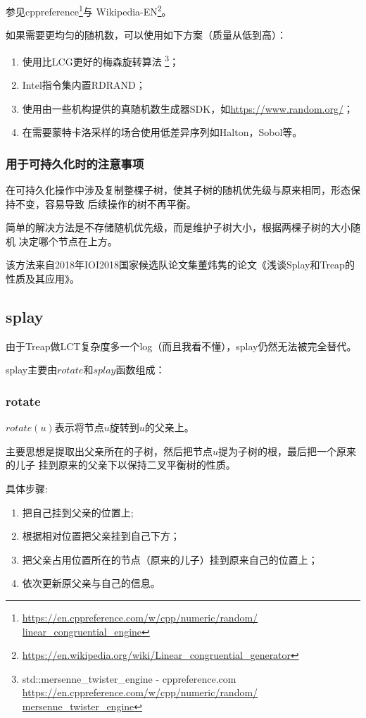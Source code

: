 参见cppreference\footnote{
	\url{https://en.cppreference.com/w/cpp/numeric/random/
		linear\_congruential\_engine}}与
Wikipedia-EN\footnote{
	\url{https://en.wikipedia.org/wiki/Linear\_congruential\_generator}}。

如果需要更均匀的随机数，可以使用如下方案（质量从低到高）：
\begin{enumerate}
	\item 使用比LCG更好的梅森旋转算法
	      \footnote{std::mersenne\_twister\_engine - cppreference.com
		      \url{https://en.cppreference.com/w/cpp/numeric/random/
			      mersenne\_twister\_engine}}；
	\item Intel指令集内置RDRAND；
	\item 使用由一些机构提供的真随机数生成器SDK，如\url{https://www.random.org/}；
	\item 在需要蒙特卡洛采样的场合使用低差异序列如Halton，Sobol等。
\end{enumerate}

\subsubsection{用于可持久化时的注意事项}
在可持久化操作中涉及复制整棵子树，使其子树的随机优先级与原来相同，形态保持不变，容易导致
后续操作的树不再平衡。

简单的解决方法是不存储随机优先级，而是维护子树大小，根据两棵子树的大小随机
决定哪个节点在上方。

该方法来自2018年IOI2018国家候选队论文集董炜隽的论文《浅谈Splay和Treap的性质及其应用》。
\subsection{splay}\label{splay}

由于Treap做LCT复杂度多一个log（而且我看不懂），splay仍然无法被完全替代。

splay主要由$rotate$和$splay$函数组成：

\subsubsection{rotate}

$rotate(u)$表示将节点$u$旋转到$u$的父亲上。

主要思想是提取出父亲所在的子树，然后把节点$u$提为子树的根，最后把一个原来的儿子
挂到原来的父亲下以保持二叉平衡树的性质。

具体步骤:
\begin{enumerate}
	\item 把自己挂到父亲的位置上;
	\item 根据相对位置把父亲挂到自己下方；
	\item 把父亲占用位置所在的节点（原来的儿子）挂到原来自己的位置上；
	\item 依次更新原父亲与自己的信息。
\end{enumerate}

